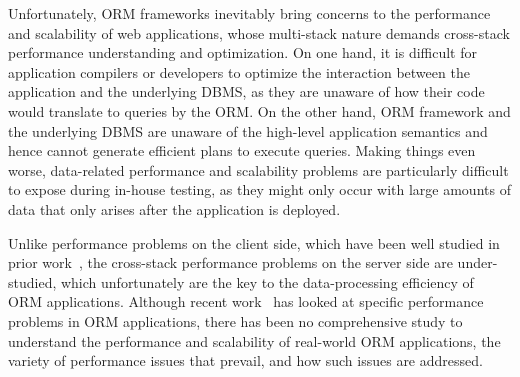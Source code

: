 Unfortunately, ORM frameworks inevitably bring concerns to the performance and scalability of web applications, whose multi-stack nature demands cross-stack performance understanding and optimization. %
On one hand, it is difficult for application compilers or developers to optimize the interaction between the application and the underlying DBMS, as they are unaware of how their code would translate to queries by the ORM. On the other hand, ORM framework and the underlying DBMS are unaware of the high-level application semantics and hence cannot generate efficient plans to execute queries.
Making things even worse, data-related performance and scalability problems are particularly difficult to expose during in-house testing, as they might only occur with large amounts of data that only arises after the application is deployed.





Unlike performance problems on the client side, which have been well studied in prior work~\cite{mark:se17:javascript, bag:microsoft2008},
the cross-stack performance problems on the server side are under-studied, which unfortunately are the key to the data-processing efficiency of ORM applications. 
Although recent work~\cite{chen:se14:antipattern, chen:se16:redundantData, cheung:pldi13, yan:cikm17} has looked at specific performance problems in ORM applications, 
there has been no comprehensive study to understand the performance and scalability of real-world ORM applications, the variety of performance issues that prevail, and how such issues are addressed.
 
